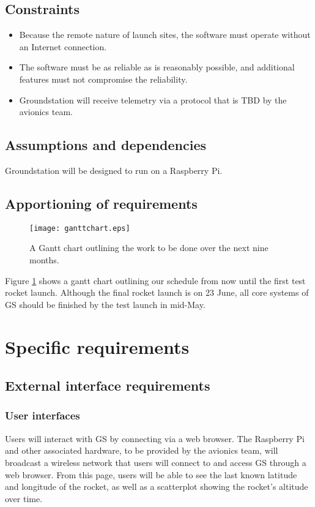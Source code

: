 \documentclass[10pt,journal,draftclsnofoot,onecolumn]{IEEEtran}
\begin{document}
	\subsection{Constraints}
	\begin{itemize}
		\item Because the remote nature of launch sites, the software must operate without an Internet connection.
		\item The software must be as reliable as is reasonably possible, and additional features must not compromise the reliability.
		\item Groundstation will receive telemetry via a protocol that is TBD by the avionics team.
	\end{itemize}
	\subsection{Assumptions and dependencies}
	Groundstation will be designed to run on a Raspberry Pi.
	
	\subsection{Apportioning of requirements}
	
	\begin{figure}
		\texttt{[image: ganttchart.eps]}
		\caption{A Gantt chart outlining the work to be done over the next nine months.}
		\label{fig:gantt}
	\end{figure}
	
	Figure \ref{fig:gantt} shows a gantt chart outlining our schedule from now until the first test rocket launch.
	Although the final rocket launch is on 23 June, all core systems of GS should be finished by the test launch in mid-May.
		
	\section{Specific requirements}
	
	\subsection{External interface requirements}
	\subsubsection{User interfaces}
	Users will interact with GS by connecting via a web browser. The Raspberry Pi and other associated hardware,
	to be provided by the avionics team,
	will broadcast a wireless network that users will connect to and access GS through a web browser.
	From this page, users will be able to see the last known latitude and longitude of the rocket,
	as well as a scatterplot showing the rocket's altitude over time.
	
\end{document}
